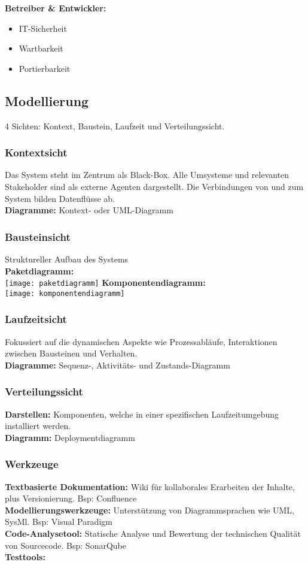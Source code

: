 \textbf{Betreiber \& Entwickler:}
\begin{itemize}[topsep=0pt, leftmargin=3mm]
    \setlength\itemsep{-0.3em}
    \item IT-Sicherheit
    \item Wartbarkeit
    \item Portierbarkeit
\end{itemize}


\subsection{Modellierung}
4 Sichten: Kontext, Baustein, Laufzeit und Verteilungssicht.
\subsubsection{Kontextsicht}
Das System steht im Zentrum als Black-Box. Alle Umsysteme und relevanten Stakeholder sind als externe Agenten dargestellt. Die Verbindungen von und zum System bilden Datenflüsse ab.\\
\textbf{Diagramme:} Kontext- oder UML-Diagramm

\subsubsection{Bausteinsicht}
Struktureller Aufbau des Systems\\
\textbf{Paketdiagramm:}\\
\texttt{[image: paketdiagramm]}
\textbf{Komponentendiagramm:}\\
\texttt{[image: komponentendiagramm]}

\subsubsection{Laufzeitsicht}
Fokussiert auf die dynamischen Aspekte wie Prozessabläufe, Interaktionen zwischen Bausteinen und Verhalten.\\
\textbf{Diagramme:} Sequenz-, Aktivitäts- und Zustands-Diagramm

\subsubsection{Verteilungssicht}
\textbf{Darstellen:} Komponenten, welche in einer spezifischen Laufzeitumgebung installiert werden.\\
\textbf{Diagramm:} Deploymentdiagramm

\subsubsection{Werkzeuge}
\textbf{Textbasierte Dokumentation:} Wiki für kollaborales Erarbeiten der Inhalte, plus Versionierung. Bsp: Confluence\\
\textbf{Modellierungswerkzeuge:} Unterstützung von Diagrammsprachen wie UML, SysMl. Bsp: Visual Paradigm\\
\textbf{Code-Analysetool:} Statische Analyse und Bewertung der technischen Qualität von Sourcecode. Bsp: SonarQube\\
\textbf{Testtools:}

